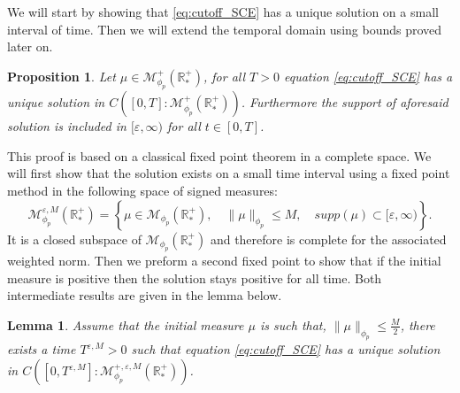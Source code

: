 \documentclass[11pt,a4paper]{article}
\newcommand{\RRP}{\mathbb{R}^+_*}
\newcommand{\MC}{\mathcal{M}}
\newtheorem{lemma}[theorem]{Lemma}
\newtheorem{proposition}[theorem]{Proposition}
\begin{document}
We will start by showing that \eqref{eq:cutoff_SCE} has a unique solution on a small interval of time. Then we will extend the temporal domain using bounds proved later on.
\begin{proposition}\label{prop:well-posedness-cutoff-smol}
    Let $\mu \in \MC^+_{\phi_p}(\RRP)$, for all $T > 0$ equation \eqref{eq:cutoff_SCE} has a unique solution in $C\left([0,T]:\MC^+_{\phi_p}(\RRP)\right)$. Furthermore the support of aforesaid solution is included in $[\varepsilon,\infty)$ for all $t \in [0,T]$.
\end{proposition}

This proof is based on a classical fixed point theorem in a complete space. We will first show that the solution exists on a small time interval using a fixed point method in the following space of signed measures:
    \[ \MC^{\varepsilon,M}_{\phi_p}(\RRP) = \left\lbrace \mu \in \MC_{\phi_p}(\RRP) ,\quad \|\mu \|_{\phi_p}\leq M,\quad supp(\mu) \subset [\varepsilon,\infty)\right\rbrace. \]
It is a closed subspace of $\MC_{\phi_p}(\RRP)$ and therefore is complete for the associated weighted norm. Then we preform a second fixed point to show that if the initial measure is positive then the solution stays positive for all time. Both intermediate results are given in the lemma below. 
\begin{lemma}
    Assume that the initial measure $\mu$ is such that, $\| \mu\|_{\phi_p} \leq \frac{M}{2}$, there exists a time $T^{\varepsilon,M} > 0$ such that equation \eqref{eq:cutoff_SCE} has a unique solution in $C\left([0,T^{\varepsilon,M}]:\MC^{+,\varepsilon,M}_{\phi_p}(\RRP)\right)$. 
\end{lemma}
\end{document}
